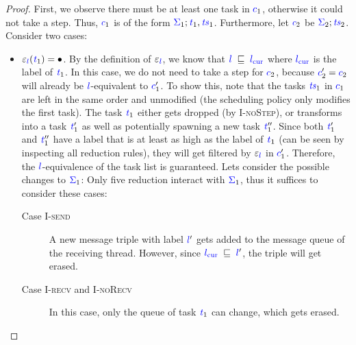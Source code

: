 \documentclass{llncs}
\newcommand{\Varid}[1]{\mathit{#1}}
\begin{document}
\begin{proof}
  First, we observe there must be at least one task in \ensuremath{\ifc{c}_{1}}, otherwise
  it could not take a step.  Thus, \ensuremath{\ifc{c}_{1}} is of the form
  \ensuremath{\ifc{\Sigma}_{1};\ifc{\Varid{t}}_{1},\ifc{\Varid{ts}}_{1}}.
  Furthermore, let \ensuremath{\ifc{c}_{2}} be \ensuremath{\ifc{\Sigma}_{2};\ifc{\Varid{ts}}_{2}}.
  Consider two cases:
  \begin{itemize}
    \item $\ensuremath{\varepsilon_{\ifc{l}}(\ifc{\Varid{t}}_{1})}=\ensuremath{\bullet}$.
    By the definition of \ensuremath{\varepsilon_{\ifc{l}}}, we know that \ensuremath{\ifc{l}\;\flows{}\;\lcurr}
    where \ensuremath{\lcurr} is the label of \ensuremath{\ifc{\Varid{t}}_{1}}.
    In this case, we do not need to take a step for
    \ensuremath{\ifc{c}_{2}}, because \ensuremath{\ifc{c}_{2}'\mathrel{=}\ifc{c}_{2}} will already be \ensuremath{\ifc{l}}-equivalent to \ensuremath{\ifc{c}_{1}'}.
    To show this, note that the tasks \ensuremath{\ifc{\Varid{ts}}_{1}} in \ensuremath{\ifc{c}_{1}} are left in the
    same order and unmodified (the scheduling policy only
    modifies the first task). The task \ensuremath{\ifc{\Varid{t}}_{1}} either
    gets dropped (by \textsc{I-noStep}), or
    transforms into a task \ensuremath{\ifc{\Varid{t}}_{1}'} as well as potentially spawning a new
    task \ensuremath{\ifc{\Varid{t}}_{1}''}.  Since both \ensuremath{\ifc{\Varid{t}}_{1}'} and \ensuremath{\ifc{\Varid{t}}_{1}''} have a label that is
    at least as high as the label of \ensuremath{\ifc{\Varid{t}}_{1}} (can be seen
    by inspecting all reduction rules), they will get filtered
    by \ensuremath{\varepsilon_{\ifc{l}}} in \ensuremath{\ifc{c}_{1}'}.  Therefore, the \ensuremath{\ifc{l}}-equivalence of the
    task list is guaranteed.
    Lets consider the possible changes to \ensuremath{\ifc{\Sigma}_{1}}:
    Only five reduction interact with \ensuremath{\ifc{\Sigma}_{1}},
    thus it suffices to consider these cases:
    \begin{description}
      \item[Case \textsc{I-send}]
      A new message triple with label \ensuremath{\ifc{l}'} gets added to the message
      queue of the receiving thread.  However, since \ensuremath{\lcurr\;\flows{}\;\ifc{l}'},
      the triple will get erased.
      \item[Case \textsc{I-recv} and \textsc{I-noRecv}]
      In this case, only the queue of
      task \ensuremath{\ifc{\Varid{t}}_{1}} can change, which gets erased.

\end{description}
\end{itemize}
\end{proof}
\end{document}
